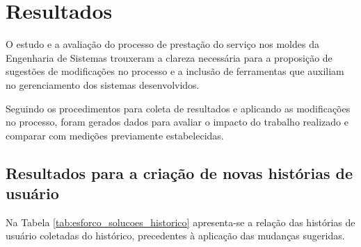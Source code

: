 
\chapter{Resultados}\label{chap:resultados}

	O estudo e a avaliação do processo de prestação do serviço nos moldes da Engenharia de Sistemas trouxeram a clareza necessária para a proposição de sugestões de modificações no
	processo e a inclusão de ferramentas que auxiliam no gerenciamento dos sistemas desenvolvidos.

	Seguindo os procedimentos para coleta de resultados e aplicando as modificações no processo, foram gerados dados para avaliar o impacto do trabalho realizado e comparar com medições
	previamente estabelecidas.

	\section{Resultados para a criação de novas histórias de usuário}

	Na Tabela \ref{tab:esforco_solucoes_historico} apresenta-se a relação das histórias de usuário coletadas do histórico, precedentes à aplicação das mudanças sugeridas.


